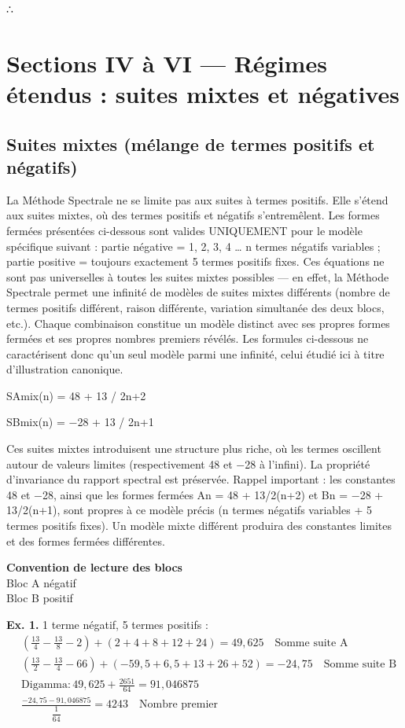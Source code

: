 \documentclass[11pt,a4paper]{article}
\begin{document}
∴

\section{Sections IV à VI — Régimes étendus : suites mixtes et négatives}
\subsection{Suites mixtes (mélange de termes positifs et négatifs)}

La Méthode Spectrale ne se limite pas aux suites à termes positifs. Elle s'étend aux suites mixtes, où des termes positifs et négatifs s'entremêlent. Les formes fermées présentées ci-dessous sont valides UNIQUEMENT pour le modèle spécifique suivant : partie négative = 1, 2, 3, 4 … n termes négatifs variables ; partie positive = toujours exactement 5 termes positifs fixes. Ces équations ne sont pas universelles à toutes les suites mixtes possibles — en effet, la Méthode Spectrale permet une infinité de modèles de suites mixtes différents (nombre de termes positifs différent, raison différente, variation simultanée des deux blocs, etc.). Chaque combinaison constitue un modèle distinct avec ses propres formes fermées et ses propres nombres premiers révélés. Les formules ci-dessous ne caractérisent donc qu'un seul modèle parmi une infinité, celui étudié ici à titre d'illustration canonique.

SAmix(n) = 48 + 13 / 2n+2

SBmix(n) = −28 + 13 / 2n+1

Ces suites mixtes introduisent une structure plus riche, où les termes oscillent autour de valeurs limites (respectivement 48 et −28 à l'infini). La propriété d'invariance du rapport spectral est préservée. Rappel important : les constantes 48 et −28, ainsi que les formes fermées An = 48 + 13/2(n+2) et Bn = −28 + 13/2(n+1), sont propres à ce modèle précis (n termes négatifs variables + 5 termes positifs fixes). Un modèle mixte différent produira des constantes limites et des formes fermées différentes.

\textbf{Convention de lecture des blocs}\\
Bloc A négatif\\
Bloc B positif

\bigskip

\textbf{Ex. 1.} 1 terme négatif, 5 termes positifs :
\begin{align*}
&\left(\frac{13}{4} - \frac{13}{8} - 2\right) + \left(2 + 4 + 8 + 12 + 24\right) = 49{,}625 \quad \text{Somme suite A} \\
&\left(\frac{13}{2} - \frac{13}{4} - 66\right) + \left(-59{,}5 + 6{,}5 + 13 + 26 + 52\right) = -24{,}75 \quad \text{Somme suite B} \\
&\text{Digamma}: 49{,}625 + \frac{2651}{64} = 91{,}046875 \\
&\frac{-24{,}75 - 91{,}046875}{\dfrac{1}{64}} = 4243 \quad \text{Nombre premier}
\end{align*}
\end{document}
